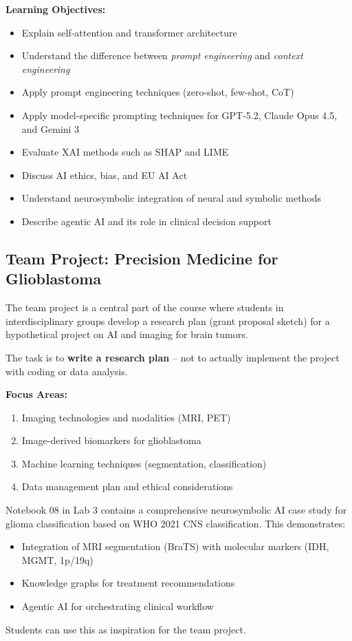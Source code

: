 \documentclass[11pt,a4paper]{article}
\begin{document}
\textbf{Learning Objectives:}
\begin{itemize}[nosep]
    \item Explain self-attention and transformer architecture
    \item Understand the difference between \emph{prompt engineering} and \emph{context engineering}
    \item Apply prompt engineering techniques (zero-shot, few-shot, CoT)
    \item Apply model-specific prompting techniques for GPT-5.2, Claude Opus 4.5, and Gemini 3
    \item Evaluate XAI methods such as SHAP and LIME
    \item Discuss AI ethics, bias, and EU AI Act
    \item Understand neurosymbolic integration of neural and symbolic methods
    \item Describe agentic AI and its role in clinical decision support
\end{itemize}

\subsection{Team Project: Precision Medicine for Glioblastoma}

The team project is a central part of the course where students in interdisciplinary groups develop a research plan (grant proposal sketch) for a hypothetical project on AI and imaging for brain tumors.

\begin{warningbox}
The task is to \textbf{write a research plan} -- not to actually implement the project with coding or data analysis.
\end{warningbox}

\textbf{Focus Areas:}
\begin{enumerate}[nosep]
    \item Imaging technologies and modalities (MRI, PET)
    \item Image-derived biomarkers for glioblastoma
    \item Machine learning techniques (segmentation, classification)
    \item Data management plan and ethical considerations
\end{enumerate}

\begin{infobox}
Notebook 08 in Lab 3 contains a comprehensive neurosymbolic AI case study for glioma classification based on WHO 2021 CNS classification. This demonstrates:
\begin{itemize}[nosep]
    \item Integration of MRI segmentation (BraTS) with molecular markers (IDH, MGMT, 1p/19q)
    \item Knowledge graphs for treatment recommendations
    \item Agentic AI for orchestrating clinical workflow
\end{itemize}
Students can use this as inspiration for the team project.
\end{infobox}
\end{document}
